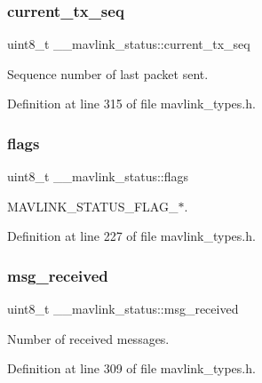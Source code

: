 \subsubsection{\texorpdfstring{current\_tx\_seq}{current\_tx\_seq}}
{\footnotesize\ttfamily uint8\+\_\+t \+\_\+\+\_\+mavlink\+\_\+status\+::current\+\_\+tx\+\_\+seq}



Sequence number of last packet sent. 



Definition at line 315 of file mavlink\+\_\+types.\+h.

\mbox{\label{struct____mavlink__status_a2b67d268b29712b9607d1796228a77a2}} 
\subsubsection{\texorpdfstring{flags}{flags}}
{\footnotesize\ttfamily uint8\+\_\+t \+\_\+\+\_\+mavlink\+\_\+status\+::flags}



M\+A\+V\+L\+I\+N\+K\+\_\+\+S\+T\+A\+T\+U\+S\+\_\+\+F\+L\+A\+G\+\_\+$\ast$. 



Definition at line 227 of file mavlink\+\_\+types.\+h.

\mbox{\label{struct____mavlink__status_a183576e45facc9da8123b7866d458680}} 
\subsubsection{\texorpdfstring{msg\_received}{msg\_received}}
{\footnotesize\ttfamily uint8\+\_\+t \+\_\+\+\_\+mavlink\+\_\+status\+::msg\+\_\+received}



Number of received messages. 



Definition at line 309 of file mavlink\+\_\+types.\+h.

\mbox{\label{struct____mavlink__status_a3e582235849323267974003eb1793e25}} 
